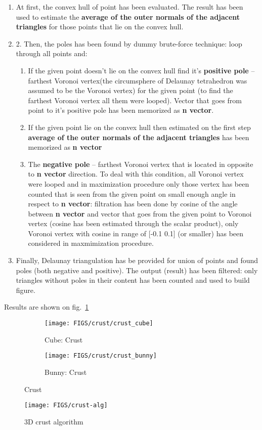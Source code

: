 \documentclass[11pt]{article}
\begin{document}
\begin{enumerate}
    \item At first, the convex hull of point has been evaluated. The result has been used to estimate the \textbf{average of the outer normals of the adjacent triangles} for those points that lie on the convex hull.
    \item 2. Then, the poles has been found by dummy brute-force technique: loop through all points and:
    \begin{enumerate}
        \item If the given point doesn't lie on the convex hull find it's \textbf{positive pole} – farthest Voronoi vertex(the circumsphere of Delaunay tetrahedron was assumed to be the Voronoi vertex) for the given point (to find the farthest Voronoi vertex all them were looped). Vector that goes from point to it's positive pole has been memorized as \textbf{n vector}.
        \item If the given point lie on the convex hull then estimated on the first step \textbf{average of the outer normals of the adjacent triangles} has been memorized as \textbf{n vector}
        \item The \textbf{negative pole} – farthest Voronoi vertex that is located in opposite to \textbf{n vector} direction. To deal with this condition, all Voronoi vertex were looped and in maximization procedure only those vertex has been counted that is seen from the given point on small enough angle in respect to \textbf{n vector}: filtration has been done by cosine of the angle between \textbf{n vector}  and vector that goes from the given point to Voronoi vertex (cosine has been estimated through the scalar product), only Voronoi vertex with cosine in range of [-0.1 0.1]  (or smaller) has been considered in maxmimization procedure.
    \end{enumerate}
    \item  Finally, Delaunay triangulation has be provided for union of points and found poles (both negative and positive). The output (result) has been filtered: only triangles without poles in their content has been counted and used to build figure.
\end{enumerate}

Results are shown on fig.~\ref{fig:crust}
\begin{figure}[h]
    \begin{subfigure}{.5\textwidth}
        \centering
        \texttt{[image: FIGS/crust/crust\_cube]}
        \caption{Cube: Crust}
    \end{subfigure}
    \begin{subfigure}{.5\textwidth}
        \centering
        \texttt{[image: FIGS/crust/crust\_bunny]}
        \caption{Bunny: Crust}
    \end{subfigure}
    \caption{Crust}
    \label{fig:crust}
\end{figure}


\begin{figure}[h]
    \centering
    \texttt{[image: FIGS/crust-alg]}
    \caption{3D crust algorithm}
    \label{alg:crust-alg}
\end{figure}



\end{document}
